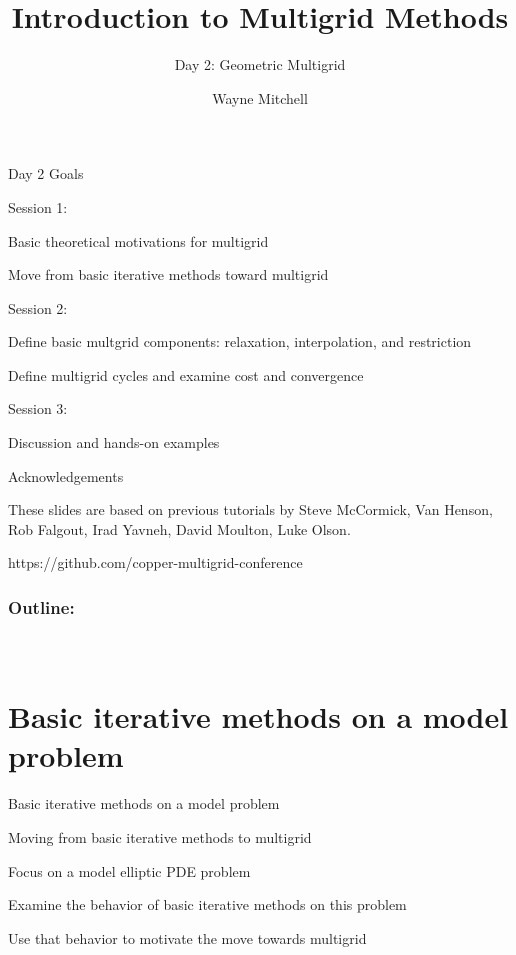 \documentclass[18pt,xcolor=table]{beamer}
\title[Multigrid]{Introduction to Multigrid Methods}
\subtitle{Day 2: Geometric Multigrid}
\author[Mitchell]{Wayne Mitchell}
\institute{\pgfuseimage{logo}\\Universit\"at Heidelberg\\Institut f\"ur Technische Informatik}
\date[]{\alert{}}
\begin{document}


\DeclareRobustCommand{\Chi}{\raisebox{2pt}{$\chi$}}

\begin{frame}{}
\begin{block}{Day 2 Goals}
\bit
\item Session 1:
\bit
\item Basic theoretical motivations for multigrid
\item Move from basic iterative methods toward multigrid
\eit
\item Session 2:
\bit
\item Define basic multgrid components: relaxation, interpolation, and restriction
\item Define multigrid cycles and examine cost and convergence
\eit
\item Session 3:
\bit
\item Discussion and hands-on examples
\eit
\eit
\end{block}
\end{frame}

\begin{frame}{}
\begin{block}{Acknowledgements}
\bit
\item These slides are based on previous tutorials by Steve McCormick, Van Henson, Rob Falgout, Irad Yavneh, David Moulton, Luke Olson.
\item https://github.com/copper-multigrid-conference
\eit
\end{block}
\end{frame}

\begin{frame}
\frametitle{\bf Outline:}
\framesubtitle{~~}
\tableofcontents
\end{frame}


\section{Basic iterative methods on a model problem}


\begin{frame}{Basic iterative methods on a model problem}
\begin{block}{Moving from basic iterative methods to multigrid}
\bit
\item Focus on a model elliptic PDE problem
\item Examine the behavior of basic iterative methods on this problem
\item Use that behavior to motivate the move towards multigrid
\eit
\end{block}
\end{frame}
\end{document}

